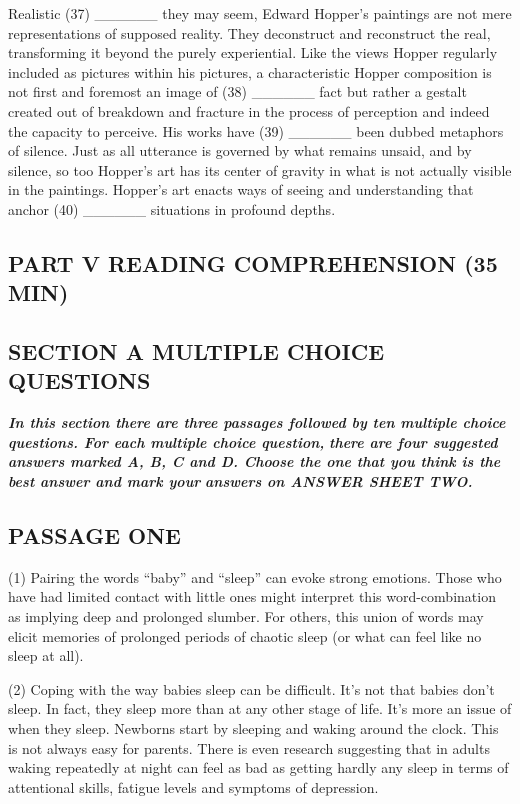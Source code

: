 \documentclass[UTF8,11pt]{ctexart}
\begin{document}
Realistic (37) \_\_\_\_\_\_ they may seem, Edward Hopper’s paintings are not mere representations of supposed reality. They deconstruct and reconstruct the real, transforming it beyond the purely experiential. Like the views Hopper regularly included as pictures within his pictures, a characteristic Hopper composition is not first and foremost an image of (38) \_\_\_\_\_\_ fact but rather a gestalt created out of breakdown and fracture in the process of perception and indeed the capacity to perceive. His works have (39) \_\_\_\_\_\_ been dubbed metaphors of silence. Just as all utterance is governed by what remains unsaid, and by silence, so too Hopper’s art has its center of gravity in what is not actually visible in the paintings. Hopper’s art enacts ways of seeing and understanding that anchor (40) \_\_\_\_\_\_ situations in profound depths.


\subsection*{\textbf{PART V READING COMPREHENSION (35 MIN)}}


\subsection*{\textbf{SECTION A MULTIPLE CHOICE QUESTIONS}}


\textbf{\textit{In this section there are three passages followed by ten multiple choice questions. For each multiple choice question,}} \textbf{\textit{there are four suggested answers marked A, B, C and D. Choose the one that you think is the best answer and mark your}} \textbf{\textit{answers on ANSWER SHEET TWO.}}


\subsection*{\textbf{PASSAGE ONE}}


(1) Pairing the words “baby” and “sleep” can evoke strong emotions. Those who have had limited contact with little ones might interpret this word-combination as implying deep and prolonged slumber. For others, this union of words may elicit memories of prolonged periods of chaotic sleep (or what can feel like no sleep at all).


(2) Coping with the way babies sleep can be difficult. It’s not that babies don’t sleep. In fact, they sleep more than at any other stage of life. It’s more an issue of when they sleep. Newborns start by sleeping and waking around the clock. This is not always easy for parents. There is even research suggesting that in adults waking repeatedly at night can feel as bad as getting hardly any sleep in terms of attentional skills, fatigue levels and symptoms of depression.
\end{document}
